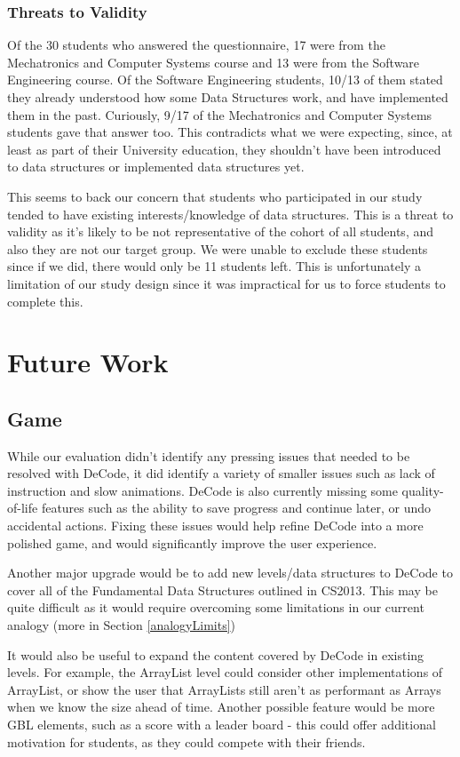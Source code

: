 \documentclass[11pt]{article}
\begin{document}
\subsubsection{Threats to Validity}
\label{studycohort}
Of the 30 students who answered the questionnaire, 17 were from the Mechatronics and Computer Systems course and 13 were from the Software Engineering course. Of the Software Engineering students, 10/13 of them stated they already understood how some Data Structures work, and have implemented them in the past. Curiously, 9/17 of the Mechatronics and Computer Systems students gave that answer too. This contradicts what we were expecting, since, at least as part of their University education, they shouldn't have been introduced to data structures or implemented data structures yet.\par
This seems to back our concern that students who participated in our study tended to have existing interests/knowledge of data structures. This is a threat to validity as it's likely to be not representative of the cohort of all students, and also they are not our target group. We were unable to exclude these students since if we did, there would only be 11 students left. This is unfortunately a limitation of our study design since it was impractical for us to force students to complete this.
\section{Future Work}
\subsection{Game}
While our evaluation didn't identify any pressing issues that needed to be resolved with DeCode, it did identify a variety of smaller issues such as lack of instruction and slow animations. DeCode is also currently missing some quality-of-life features such as the ability to save progress and continue later, or undo accidental actions. Fixing these issues would help refine DeCode into a more polished game, and would significantly improve the user experience. \par
Another major upgrade would be to add new levels/data structures to DeCode to cover all of the Fundamental Data Structures outlined in CS2013\cite{CS2013}. This may be quite difficult as it would require overcoming some limitations in our current analogy (more in Section \ref{analogyLimits})\par
It would also be useful to expand the content covered by DeCode in existing levels. For example, the ArrayList level could consider other implementations of ArrayList, or show the user that ArrayLists still aren't as performant as Arrays when we know the size ahead of time. Another possible feature would be more GBL elements, such as a score with a leader board - this could offer additional motivation for students, as they could compete with their friends.
\end{document}
